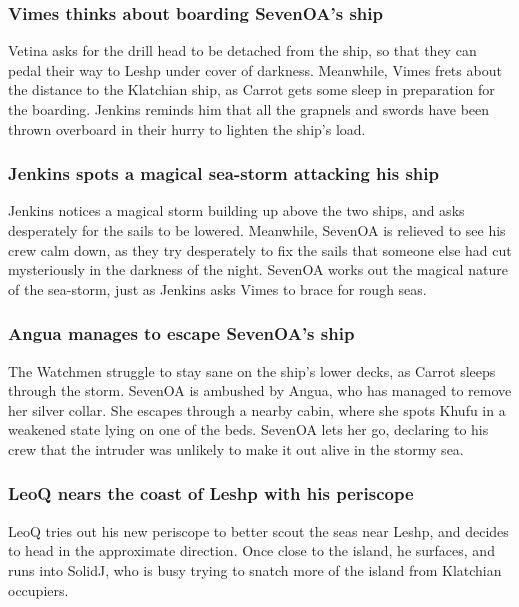 \subsubsection{\Gls{Vimes} thinks about boarding \Gls{SevenOA}'s ship}
\Gls{Vetina} asks for the drill head to be detached from the ship, so that they can pedal their way
to Leshp under cover of darkness. Meanwhile, \Gls{Vimes} frets about the distance to the Klatchian
ship, as \Gls{Carrot} gets some sleep in preparation for the boarding. \Gls{Jenkins} reminds him
that all the grapnels and swords have been thrown overboard in their hurry to lighten the ship's
load.

\subsubsection{\Gls{Jenkins} spots a magical sea-storm attacking his ship}
\Gls{Jenkins} notices a magical storm building up above the two ships, and asks desperately for the
sails to be lowered. Meanwhile, \Gls{SevenOA} is relieved to see his crew calm down, as they try
desperately to fix the sails that someone else had cut mysteriously in the darkness of the night.
\Gls{SevenOA} works out the magical nature of the sea-storm, just as \Gls{Jenkins} asks \Gls{Vimes}
to brace for rough seas.

\subsubsection{\Gls{Angua} manages to escape \Gls{SevenOA}'s ship}
The Watchmen struggle to stay sane on the ship's lower decks, as \Gls{Carrot} sleeps through the
storm. \Gls{SevenOA} is ambushed by \Gls{Angua}, who has managed to remove her silver collar. She
escapes through a nearby cabin, where she spots \Gls{Khufu} in a weakened state lying on one of the
beds. \Gls{SevenOA} lets her go, declaring to his crew that the intruder was unlikely to make it
out alive in the stormy sea.

\subsubsection{\Gls{LeoQ} nears the coast of Leshp with his periscope}
\Gls{LeoQ} tries out his new periscope to better scout the seas near Leshp, and decides to head in
the approximate direction. Once close to the island, he surfaces, and runs into \Gls{SolidJ}, who is
busy trying to snatch more of the island from Klatchian occupiers.

\subsection{}
